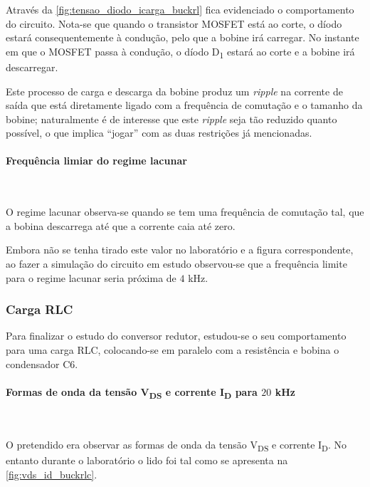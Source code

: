 \documentclass[a4paper,11pt]{article}
\numberwithin{equation}{section}
\begin{document}
Através da \autoref{fig:tensao_diodo_icarga_buckrl} fica evidenciado o comportamento do circuito. Nota-se que quando o transistor MOSFET está ao corte, o díodo estará consequentemente à condução, pelo que a bobine irá carregar. No instante em que o MOSFET passa à condução, o díodo D\textsubscript{1} estará ao corte e a bobine irá descarregar. 

Este processo de carga e descarga da bobine produz um \textit{ripple} na corrente de saída que está diretamente ligado com a frequência de comutação e o tamanho da bobine; naturalmente é de interesse que este \textit{ripple} seja tão reduzido quanto possível, o que implica ``jogar'' com as duas restrições já mencionadas.

\paragraph{Frequência limiar do regime lacunar}\mbox{}\

O regime lacunar observa-se quando se tem uma frequência de comutação tal, que a bobina descarrega até que a corrente caia até zero.

Embora não se tenha tirado este valor no laboratório e a figura correspondente,  ao fazer a simulação do circuito em estudo observou-se que a frequência limite para o regime lacunar seria próxima de $4$ kHz.

\subsubsection{Carga RLC}

Para finalizar o estudo do conversor redutor, estudou-se o seu comportamento para uma carga RLC, colocando-se em paralelo com a resistência e bobina o condensador C6.

\paragraph{Formas de onda da tensão V\textsubscript{DS} e corrente I\textsubscript{D} para $20$ kHz}\mbox{}\

O pretendido era observar as formas de onda da tensão V\textsubscript{DS} e corrente I\textsubscript{D}. No entanto durante o laboratório o lido foi tal como se apresenta na \autoref{fig:vds_id_buckrlc}.
\end{document}

